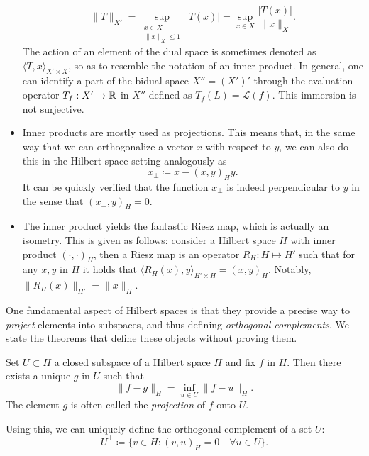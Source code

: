 \begin{itemize}
\begin{equation}
            \|T\|_{X'} = \sup_{\substack{x\in X\\ \|x\|_X\leq 1}} |T(x)|= \sup_{x\in X}\frac{|T(x)|}{\|x\|_X}.
            \end{equation}
        The action of an element of the dual space is sometimes denoted as $\langle T, x\rangle_{X'\times X}$, so as to resemble the notation of an inner product. In general, one can identify a part of the bidual space $X'' = (X')'$ through the evaluation operator $T_f:X'\mapsto \mathbb{R}$ in $X''$ defined as $T_f(L) = \mathcal{L}(f)$. This immersion is not surjective. 
        \item Inner products are mostly used as projections. This means that, in the same way that we can orthogonalize a vector $x$ with respect to $y$, we can also do this in the Hilbert space setting analogously as 
            \begin{equation}\label{eq:projection-orthogonalization}
            x_\perp \coloneqq x - (x, y)_H y.
            \end{equation}
        It can be quickly verified that the function $x_\perp$ is indeed perpendicular to $y$ in the sense that $(x_\perp, y)_H=0$. 
        \item The inner product yields the fantastic Riesz map, which is actually an isometry. This is given as follows: consider a Hilbert space $H$ with inner product $(\cdot, \cdot)_H$, then a Riesz map is an operator $R_H: H\mapsto H'$ such that for any $x,y$ in $H$ it holds that $\langle R_H(x), y\rangle_{H'\times H} = (x, y)_H$. Notably, $\|R_H(x)\|_{H'} = \| x \|_H$. 
    \end{itemize}
One fundamental aspect of Hilbert spaces is that they provide a precise way to \textit{project} elements into subspaces, and thus defining \textit{orthogonal complements}. We state the theorems that define these objects without proving them. 
\begin{theorem}\label{thm:best-approximation}
    Set $U\subset H$ a closed subspace of a Hilbert space $H$ and fix $f$ in $H$. Then there exists a unique $g$ in $U$ such that
        \begin{equation}\label{eq:best-approximation} 
        \|f - g \|_H = \inf_{u\in U} \| f - u\|_H.
        \end{equation}
    The element $g$ is often called the \textit{projection} of $f$ onto $U$. 
\end{theorem}
Using this, we can uniquely define the orthogonal complement of a set $U$: 
    \begin{equation}\label{eq:orthogonal-complement}
    U^\perp \coloneqq \{v\in H: (v, u)_H = 0 \quad\forall u\in U\}.
    \end{equation}
